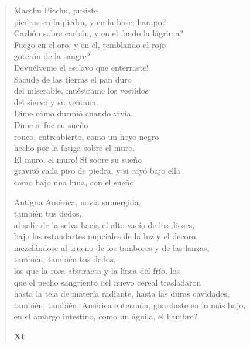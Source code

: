 \documentclass[12pt]{article}
\begin{document}
\begin{verse}
Macchu Picchu, pusiste\\
piedras en la piedra, y en la base, harapo?\\
Carbón sobre carbón, y en el fondo la lágrima?\\
Fuego en el oro, y en él, temblando el rojo\\
goterón de la sangre?\\
Devuélveme el esclavo que enterraste!\\
Sacude de las tierras el pan duro\\
del miserable, muéstrame los vestidos\\
del siervo y su ventana.\\
Dime cómo durmió cuando vivía.\\
Dime si fue su sueño\\
ronco, entreabierto, como un hoyo negro\\
hecho por la fatiga sobre el muro.\\
El muro, el muro! Si sobre su sueño\\
gravitó cada piso de piedra, y si cayó bajo ella\\
como bajo una luna, con el sueño!  

Antigua América, novia sumergida,\\
también tus dedos,\\
al salir de la selva hacia el alto vacío de los dioses,\\
bajo los estandartes nupciales de la luz y el decoro,\\
mezclándose al trueno de los tambores y de las lanzas,\\
también, también tus dedos,\\
los que la rosa abstracta y la línea del frío, los\\
que el pecho sangriento del nuevo cereal trasladaron\\
hasta la tela de materia radiante, hasta las duras cavidades,\\
también, también, América enterrada, guardaste en lo más bajo,\\
en el amargo intestino, como un águila, el hambre?  

{\bfseries\scshape {XI}}


\end{verse}
\end{document}
